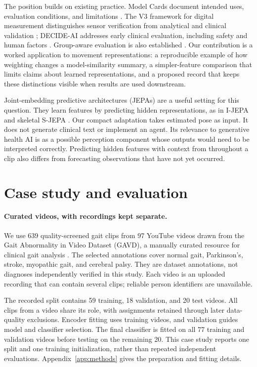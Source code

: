 \documentclass{article}
\begin{document}
The position builds on existing practice. Model Cards document intended uses, evaluation conditions, and limitations \citep{mitchell2019modelcards}. The V3 framework for digital measurement distinguishes sensor verification from analytical and clinical validation \citep{goldsack2020v3}; DECIDE-AI addresses early clinical evaluation, including safety and human factors \citep{vasey2022decideai}. Group-aware evaluation is also established \citep{roberts2017crossvalidation}. Our contribution is a worked application to movement representations: a reproducible example of how weighting changes a model-similarity summary, a simpler-feature comparison that limits claims about learned representations, and a proposed record that keeps these distinctions visible when results are used downstream.

Joint-embedding predictive architectures (JEPAs) are a useful setting for this question. They learn features by predicting hidden representations, as in I-JEPA and skeletal S-JEPA \citep{assran2023ijepa,abdelfattah2024sjepa}. Our compact adaptation takes estimated pose as input. It does not generate clinical text or implement an agent. Its relevance to generative health AI is as a possible perception component whose outputs would need to be interpreted correctly. Predicting hidden features with context from throughout a clip also differs from forecasting observations that have not yet occurred.

\section{Case study and evaluation}

\paragraph{Curated videos, with recordings kept separate.}
We use 639 quality-screened gait clips from 97 YouTube videos drawn from the Gait Abnormality in Video Dataset (GAVD), a manually curated resource for clinical gait analysis \citep{ranjan2025gavd}. The selected annotations cover normal gait, Parkinson's, stroke, myopathic gait, and cerebral palsy. They are dataset annotations, not diagnoses independently verified in this study. Each video is an uploaded recording that can contain several clips; reliable person identifiers are unavailable.

The recorded split contains 59 training, 18 validation, and 20 test videos. All clips from a video share its role, with assignments retained through later data-quality exclusions. Encoder fitting uses training videos, and validation guides model and classifier selection. The final classifier is fitted on all 77 training and validation videos before testing on the remaining 20. This case study reports one split and one training initialization, rather than repeated independent evaluations. Appendix~\ref{app:methods} gives the preparation and fitting details.
\end{document}
